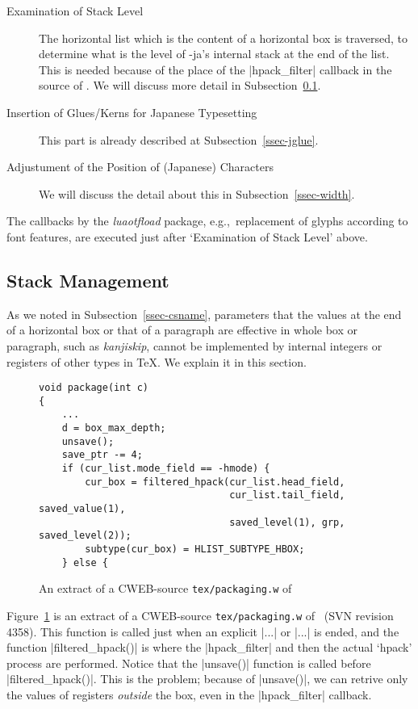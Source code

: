 \documentclass{ajt}
\begin{document}
\begin{description}
\item[Examination of Stack Level] The horizontal list which
	   is the content of a horizontal box is traversed, 
to determine what is the level of \LuaTeX-ja's internal stack at the end
	   of the list. This is needed because of the place of
	   the |hpack_filter| callback in the source of \LuaTeX. We will discuss more
	   detail in Subsection~\ref{ssec-stack}.

\item[Insertion of Glues/Kerns for Japanese Typesetting]
This part is already described at Subsection~\ref{ssec-jglue}. 

\item[Adjustument of the Position of (Japanese) Characters]
We will discuss the detail about this in Subsection~\ref{ssec-width}.
\end{description}

The callbacks by the \emph{luaotfload} package, e.g.,~replacement of
glyphs according to font features, are executed just after `Examination
of Stack Level' above. 

\subsection{Stack Management}
\label{ssec-stack}

As we noted in Subsection~\ref{ssec-csname}, parameters that the values
at the end of a horizontal box or that of a paragraph are effective in
whole box or paragraph, such as \emph{kanjiskip}, cannot be implemented
by internal integers or registers of other types in \TeX. We explain it
in this section.

\begin{figure}
\begin{lstlisting}
void package(int c)
{
    ...
    d = box_max_depth;
    unsave();
    save_ptr -= 4;
    if (cur_list.mode_field == -hmode) {
        cur_box = filtered_hpack(cur_list.head_field,
                                 cur_list.tail_field, saved_value(1),
                                 saved_level(1), grp, saved_level(2));
        subtype(cur_box) = HLIST_SUBTYPE_HBOX;
    } else {
\end{lstlisting}
\caption{An extract of a CWEB-source \texttt{tex/packaging.w} of \LuaTeX}
\label{fig-ltsrc}
\end{figure}

Figure~\ref{fig-ltsrc} is an extract of a CWEB-source
\texttt{tex/packaging.w} of \LuaTeX\ (SVN revision 4358). This function
is called just when an explicit |\hbox{...}| or |\vbox{...}| is ended, and
the function |filtered_hpack()| is where the |hpack_filter| and then the
actual `hpack' process are performed. Notice that the |unsave()|
function is called before |filtered_hpack()|. This is the problem;
because of |unsave()|, we can retrive only the values of registers
\emph{outside} the box, even in the |hpack_filter| callback.
\end{document}
